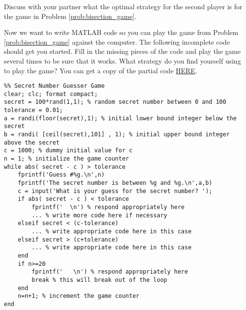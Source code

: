 \begin{problem}
    Discuss with your partner what the optimal strategy for the second player is for the
    game in Problem \ref{prob:bisection_game}.
\end{problem}

\begin{problem}
    Now we want to write MATLAB code so you can play the game from Problem
    \ref{prob:bisection_game} against the computer.  The following incomplete code should
    get you started.  Fill in the missing pieces of the code and play the game several
    times to be sure that it works.  What strategy do you find yourself using to play the
    game? You can get a copy of the partial code
    \href{https://drive.google.com/file/d/1QFeb6ZGMppKtV-03_cbUzwaaKM8N39t2/view?usp=sharing}{HERE}.
\begin{lstlisting}
%% Secret Number Guesser Game
clear; clc; format compact;
secret = 100*rand(1,1); % random secret number between 0 and 100
tolerance = 0.01;
a = randi(floor(secret),1); % initial lower bound integer below the secret
b = randi( [ceil(secret),101] , 1); % initial upper bound integer above the secret
c = 1000; % dummy initial value for c
n = 1; % initialize the game counter
while abs( secret - c ) > tolerance
    fprintf('Guess #%g.\n',n)
    fprintf('The secret number is between %g and %g.\n',a,b)
    c = input('What is your guess for the secret number? ');
    if abs( secret - c ) < tolerance
        fprintf('  \n') % respond appropriately here
        ... % write more code here if necessary
    elseif secret < (c-tolerance)
        ... % write appropriate code here in this case
    elseif secret > (c+tolerance)
        ... % write appropriate code here in this case
    end
    if n>=20
        fprintf('   \n') % respond appropriately here
        break % this will break out of the loop
    end
    n=n+1; % increment the game counter
end
\end{lstlisting}
\end{problem}



\newpage
